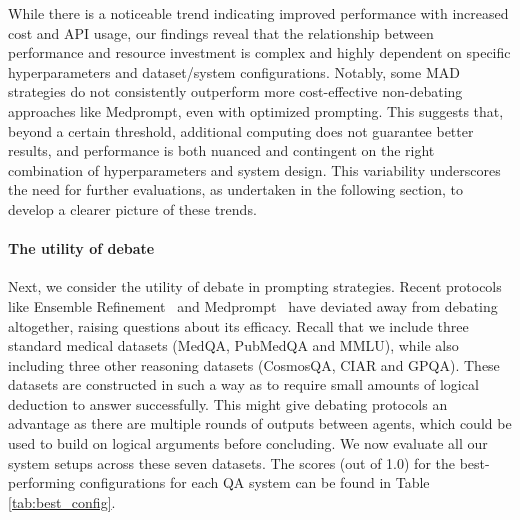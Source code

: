 \documentclass{article}  %
\newcommand{\ngr}[1]{{\color{blue}[Nathan: #1]}}
\begin{document}
While there is a noticeable trend indicating improved performance with increased cost and API usage, our findings reveal that the relationship between performance and resource investment is complex and highly dependent on specific hyperparameters and dataset/system configurations. Notably, some MAD strategies do not consistently outperform more cost-effective non-debating approaches like Medprompt, even with optimized prompting. This suggests that, beyond a certain threshold, additional computing does not guarantee better results, and performance is both nuanced and contingent on the right combination of hyperparameters and system design. This variability underscores the need for further evaluations, as undertaken in the following section, to develop a clearer picture of these trends.








\paragraph{The utility of debate}
Next, we consider the utility of debate in prompting strategies. Recent protocols like Ensemble Refinement~\cite{singhal2023medpalm} and Medprompt~\cite{nori2023medprompt} have deviated away from debating altogether, raising questions about its efficacy. Recall that we include three standard medical datasets (MedQA, PubMedQA and MMLU), while also including three other reasoning datasets (CosmosQA, CIAR and GPQA). These datasets are constructed in such a way as to require small amounts of logical deduction to answer successfully. This might give debating protocols an advantage as there are multiple rounds of outputs between agents, which could be used to build on logical arguments before concluding.  We now evaluate all our system setups across these seven datasets. The scores (out of 1.0) for the best-performing configurations for each QA system can be found in Table \ref{tab:best_config}.
\end{document}

